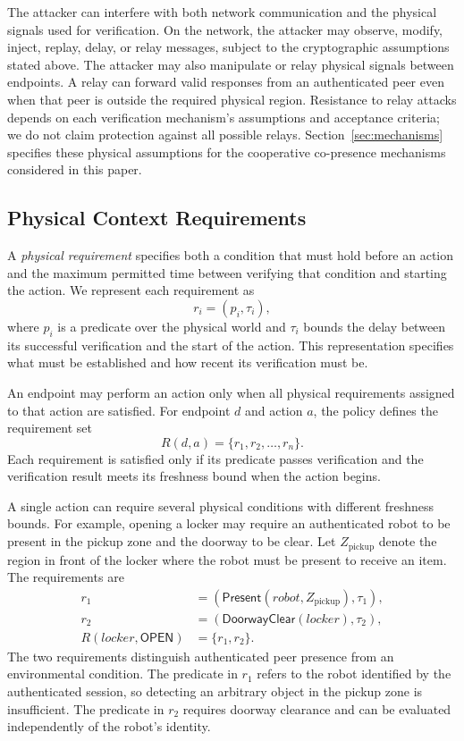 \documentclass[sigconf,authordraft]{acmart}
\begin{document}
The attacker can interfere with both network communication and the physical signals used for verification.
On the network, the attacker may observe, modify, inject, replay, delay, or relay messages, subject to the cryptographic assumptions stated above.
The attacker may also manipulate or relay physical signals between endpoints.
A relay can forward valid responses from an authenticated peer even when that peer is outside the required physical region.
Resistance to relay attacks depends on each verification mechanism’s assumptions and acceptance criteria; we do not claim protection against all possible relays.
Section~\ref{sec:mechanisms} specifies these physical assumptions for the cooperative co-presence mechanisms considered in this paper.

\subsection{Physical Context Requirements}
\label{sec:requirements}

A \emph{physical requirement} specifies both a condition that must hold before an action and the maximum permitted time between verifying that condition and starting the action.
We represent each requirement as
\begin{equation}
r_i=(p_i,\tau_i),
\end{equation}
where $p_i$ is a predicate over the physical world and $\tau_i$ bounds the delay between its successful verification and the start of the action.
This representation specifies what must be established and how recent its verification must be.

An endpoint may perform an action only when all physical requirements assigned to that action are satisfied.
For endpoint $d$ and action $a$, the policy defines the requirement set
\begin{equation}
R(d,a)=\{r_1,r_2,\ldots,r_n\}.
\end{equation}
Each requirement is satisfied only if its predicate passes verification and the verification result meets its freshness bound when the action begins.

A single action can require several physical conditions with different freshness bounds.
For example, opening a locker may require an authenticated robot to be present in the pickup zone and the doorway to be clear.
Let $Z_{\mathrm{pickup}}$ denote the region in front of the locker where the robot must be present to receive an item.
The requirements are
\begin{align}
r_1 &= (\mathsf{Present}(\mathit{robot},Z_{\mathrm{pickup}}),\tau_1),\\
r_2 &= (\mathsf{DoorwayClear}(\mathit{locker}),\tau_2),\\
R(\mathit{locker},\mathsf{OPEN}) &= \{r_1,r_2\}.
\end{align}
The two requirements distinguish authenticated peer presence from an environmental condition.
The predicate in $r_1$ refers to the robot identified by the authenticated session, so detecting an arbitrary object in the pickup zone is insufficient.
The predicate in $r_2$ requires doorway clearance and can be evaluated independently of the robot's identity.
\end{document}
